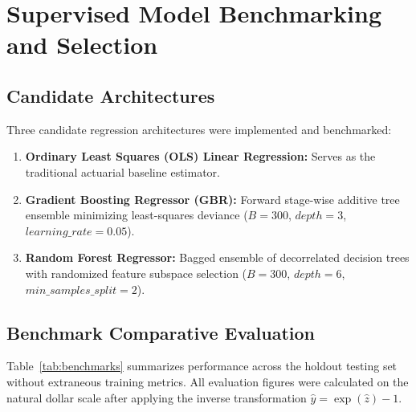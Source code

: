 \documentclass[12pt,a4paper]{report}
\begin{document}
\chapter{Supervised Model Benchmarking and Selection}
\label{chap:modeling}

\section{Candidate Architectures}
Three candidate regression architectures were implemented and benchmarked:
\begin{enumerate}
    \item \textbf{Ordinary Least Squares (OLS) Linear Regression:} Serves as the traditional actuarial baseline estimator.
    \item \textbf{Gradient Boosting Regressor (GBR):} Forward stage-wise additive tree ensemble minimizing least-squares deviance ($B = 300$, $depth = 3$, $learning\_rate = 0.05$).
    \item \textbf{Random Forest Regressor:} Bagged ensemble of decorrelated decision trees with randomized feature subspace selection ($B = 300$, $depth = 6$, $min\_samples\_split = 2$).
\end{enumerate}

\section{Benchmark Comparative Evaluation}
Table~\ref{tab:benchmarks} summarizes performance across the holdout testing set without extraneous training metrics. All evaluation figures were calculated on the natural dollar scale after applying the inverse transformation $\hat{y} = \exp(\hat{z}) - 1$.

\begin{table}[htbp]
\centering
\caption{Comprehensive Supervised Model Benchmarking Evaluation}
\label{tab:benchmarks}
\vspace{4pt}
\end{table}
\end{document}
